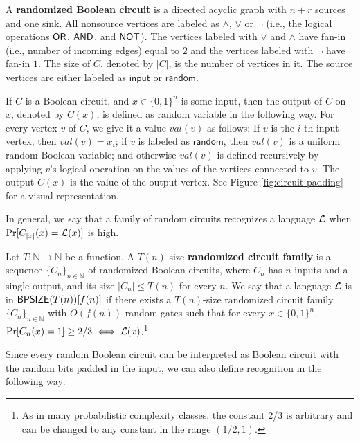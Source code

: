 \begin{definition}
    A \textbf{randomized Boolean circuit} is a directed acyclic graph with $n+r$ sources and one sink.
    All nonsource vertices are labeled as $\land$, $\lor$ or $\lnot$ (i.e., the logical operations $\mathsf{OR}$, $\mathsf{AND}$, and $\mathsf{NOT}$).
    The vertices labeled with $\lor$ and $\land$ have fan-in (i.e., number of incoming edges) equal to $2$ and the vertices labeled with $\lnot$ have fan-in $1$. 
    The size of $C$, denoted by $|C|$, is the number of vertices in it.
    The source vertices are either labeled as $\mathsf{input}$ or $\mathsf{random}$.
    
    If $C$ is a Boolean circuit, and $x \in \{0,1\}^n$ is some input, then the output of $C$ on $x$, denoted by $C(x)$, is defined as random variable in the following way.
    For every vertex $v$ of $C$, we give it a value $val(v)$ as follows: 
    If $v$ is the $i$-th input vertex, then $val(v) = x_i$; if $v$ is labeled as $\mathsf{random}$, then $val(v)$ is a uniform random Boolean variable; and otherwise $val(v)$ is defined recursively by applying $v$'s logical operation on the values of the vertices connected to $v$. 
    The output $C(x)$ is the value of the output vertex.
    See Figure \ref{fig:circuit-padding} for a visual representation.
\end{definition}

In general, we say that a family of random circuits recognizes a language $\mathcal{L}$ when $\Pr[C_{|x|}(x) = \mathcal{L}(x)]$ is high.

\begin{definition}
    Let $T : \mathbb{N} \to \mathbb{N}$ be a function.
    A $T(n)$-size \textbf{randomized circuit family} is a sequence $\{C_n\}_{n\in\mathbb{N}}$ of randomized Boolean circuits, where $C_n$ has $n$ inputs and a single output, and its size $|C_n| \leq T(n)$ for every $n$.
    We say that a language $\mathcal{L}$ is in $\mathsf{BPSIZE}(T(n))[f(n)]$ if there exists a $T(n)$-size randomized circuit family $\{C_n\}_{n\in\mathbb{N}}$ with $O(f(n))$ random gates such that for every $x\in\{0,1\}^n$, $\Pr[C_n(x) = 1] \geq 2/3 \iff \mathcal{L}(x)$.\footnote{As in many probabilistic complexity classes, the constant 2/3 is arbitrary and can be changed to any constant in the range $(1/2, 1)$.}
\end{definition}

Since every random Boolean circuit can be interpreted as Boolean circuit with the random bits padded in the input, we can also define recognition in the following way:

